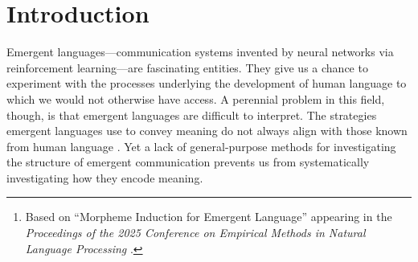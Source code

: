 
\begin{abstract}
We introduce CSAR, an algorithm for inducing morphemes from emergent language corpora of parallel utterances and meanings.
It is a greedy algorithm that (1) weights morphemes based on mutual information between forms and meanings, (2) selects the highest-weighted pair, (3) removes it from the corpus, and (4) repeats the process to induce further morphemes (i.e., Count, Select, Ablate, Repeat).
The effectiveness of CSAR is first validated on procedurally generated datasets and compared against baselines for related tasks.
Second, we validate CSAR's performance on human language data to show that the algorithm makes reasonable predictions in adjacent domains.
Finally, we analyze a handful of emergent languages, quantifying linguistic characteristics like degree of synonymy and polysemy.
\unskip\footnote{Based on ``Morpheme Induction for Emergent Language'' appearing in the \emph{Proceedings of the 2025 Conference on Empirical Methods in Natural Language Processing} \citep{boldt2025csar}.}
\end{abstract}


\section{Introduction}

Emergent languages---communication systems invented by neural networks via reinforcement learning---are fascinating entities.
They give us a chance to experiment with the processes underlying the development of human language to which we would not otherwise have access.
A perennial problem in this field, though, is that emergent languages are difficult to interpret.
The strategies emergent languages use to convey meaning do not always align with those known from human language \citep{kottur-etal-2017-natural,chaabouni2019antiefficient,kharitonov2020emergentlanguagegeneralizationacquisition}.
Yet a lack of general-purpose methods for investigating the structure of emergent communication prevents us from systematically investigating how they encode meaning.

